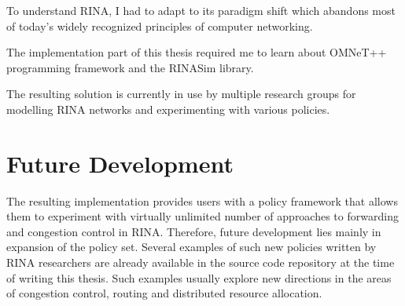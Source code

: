     To understand RINA, I had to adapt to its paradigm shift which abandons most of today's widely recognized principles of computer networking.

    The implementation part of this thesis required me to learn about OMNeT++ programming framework and the RINASim library.

    The resulting solution is currently in use by multiple research groups for modelling RINA networks and experimenting with various policies.

    \section{Future Development}

    The resulting implementation provides users with a policy framework that allows them to experiment with virtually unlimited number of approaches to forwarding and congestion control in RINA. Therefore, future development lies mainly in expansion of the policy set. Several examples of such new policies written by RINA researchers are already available in the source code repository at the time of writing this thesis. Such examples usually explore new directions in the areas of congestion control, routing and distributed resource allocation.

